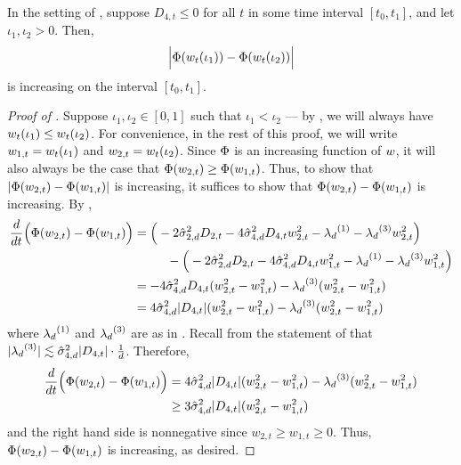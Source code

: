 \begin{lemma} \label{lemma:case_1_potential_increase} 
In the setting of , suppose $D_{4, t} \leq 0$ for all $t$ in some time interval $[t_0, t_1]$, and let $\iota_1, \iota_2 > 0$. Then, 
\begin{align}
\Big|\Phi(w_t(\iota_1)) - \Phi(w_t(\iota_2))\Big|
\end{align}
is increasing on the interval $[t_0, t_1]$.
\end{lemma}
\begin{proof}[Proof of ]
Suppose $\iota_1, \iota_2 \in [0, 1]$ such that $\iota_1 < \iota_2$ --- by , we will always have $w_t(\iota_1) \leq w_t(\iota_2)$. For convenience, in the rest of this proof, we will write $w_{1, t} = w_t(\iota_1)$ and $w_{2, t} = w_t(\iota_2)$. Since $\Phi$ is an increasing function of $w$, it will also always be the case that $\Phi(w_{2, t}) \geq \Phi(w_{1, t})$. Thus, to show that $|\Phi(w_{2, t}) - \Phi(w_{1, t})|$ is increasing, it suffices to show that $\Phi(w_{2, t}) - \Phi(w_{1, t})$ is increasing. By ,
\begin{align}
\frac{d}{dt}\Big(\Phi(w_{2, t}) - \Phi(w_{1, t})\Big)
& = \Big(-2 \hat{\sigma}_{2, d}^2 D_{2, t} - 4 \hat{\sigma}_{4, d}^2 D_{4, t} w_{2, t}^2 - {\lambda_d}^{(1)} - {\lambda_d}^{(3)} w_{2, t}^2\Big) \\
& \,\,\,\,\,\,\,\,\,\,\,\,\,\,\,\, - \Big(-2 \hat{\sigma}_{2, d}^2 D_{2, t} - 4 \hat{\sigma}_{4, d}^2 D_{4, t} w_{1, t}^2 - {\lambda_d}^{(1)} - {\lambda_d}^{(3)} w_{1, t}^2 \Big) \\
& = -4\hat{\sigma}_{4, d}^2 D_{4, t} (w_{2, t}^2 - w_{1, t}^2) - {\lambda_d}^{(3)} (w_{2, t}^2 - w_{1, t}^2) \\
& = 4 \hat{\sigma}_{4, d}^2 |D_{4, t}| (w_{2, t}^2 - w_{1, t}^2) - {\lambda_d}^{(3)} (w_{2, t}^2 - w_{1, t}^2)
\end{align}
where ${\lambda_d}^{(1)}$ and ${\lambda_d}^{(3)}$ are as in . Recall from the statement of  that $|{\lambda_d}^{(3)}| \lesssim \hat{\sigma}_{4, d}^2 |D_{4, t}| \cdot \frac{1}{d}$. Therefore, 
\begin{align}
\frac{d}{dt}\Big(\Phi(w_{2, t}) - \Phi(w_{1, t})\Big)
& = 4\hat{\sigma}_{4, d}^2 |D_{4, t}| (w_{2, t}^2 - w_{1, t}^2) - {\lambda_d}^{(3)} (w_{2, t}^2 - w_{1, t}^2) \\
& \geq 3 \hat{\sigma}_{4, d}^2 |D_{4, t}| (w_{2, t}^2 - w_{1, t}^2)
\end{align}
and the right hand side is nonnegative since $w_{2, t} \geq w_{1, t} \geq 0$. Thus, $\Phi(w_{2, t}) - \Phi(w_{1, t})$ is increasing, as desired.
\end{proof}

